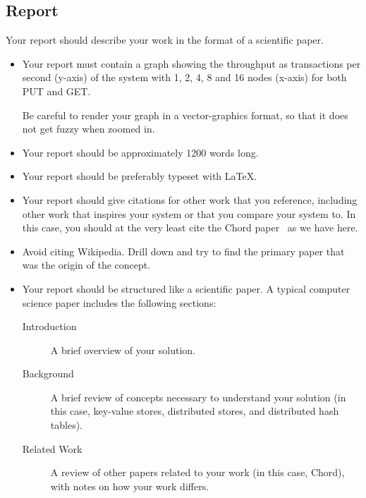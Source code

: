 \documentclass[a4paper]{article}
\begin{document}
\subsection{Report}

Your report should describe your work in the format of a scientific paper.

\begin{itemize}
    \item Your report must contain a graph showing the throughput as transactions per second (y-axis) of the system with 1, 2, 4, 8 and 16 nodes (x-axis) for both PUT and GET.

        Be careful to render your graph in a vector-graphics format,
        so that it does not get fuzzy when zoomed in.

    \item Your report should be approximately 1200 words long.

    \item Your report should be preferably typeset with \LaTeX{}.

    \item Your report should give citations for other work that you reference,
        including other work that inspires your system or that you compare your system to.
        In this case, you should at the very least cite
        the Chord paper~\cite{stoica2003chord} as we have here.

    \item Avoid citing Wikipedia.
        Drill down and try to find the primary paper that was the origin of the concept.

    \item Your report should be structured like a scientific paper.
        A typical computer science paper includes the following sections:

        \begin{description}
            \item[Introduction]
                A brief overview of your solution.

            \item[Background]
                A brief review of concepts necessary to understand your solution (in this case, key-value stores, distributed stores, and distributed hash tables).

            \item[Related Work] A review of other papers related to your work
                (in this case, Chord),
                with notes on how your work differs.


\end{description}
\end{itemize}
\end{document}

